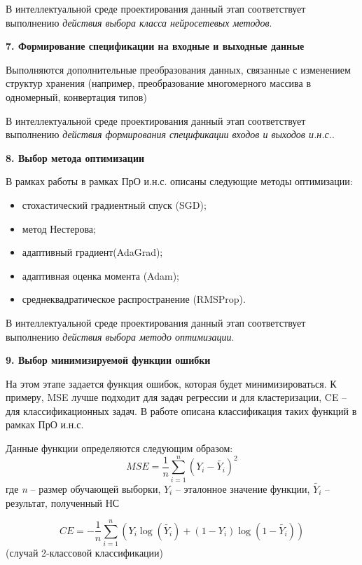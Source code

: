 В интеллектуальной среде проектирования данный этап соответствует выполнению \textit{действия выбора класса нейросетевых методов}.

\textbf{7. Формирование спецификации на входные и выходные данные}

Выполняются дополнительные преобразования данных, связанные с изменением структур хранения (например, преобразование многомерного массива в одномерный, конвертация типов)

В интеллектуальной среде проектирования данный этап соответствует выполнению \textit{действия формирования спецификации входов и выходов и.н.с.}.

\textbf{8. Выбор метода оптимизации }

В рамках работы \cite{Kovalev2022} в рамках ПрО и.н.с. описаны следующие методы оптимизации:
\begin{itemize}
	\item стохастический градиентный спуск (SGD);
	\item метод Нестерова;
	\item адаптивный градиент(AdaGrad);
	\item адаптивная оценка момента (Adam);
	\item среднеквадратическое распространение (RMSProp).
\end{itemize}

В интеллектуальной среде проектирования данный этап соответствует выполнению \textit{действия выбора методо оптимизации}.

\textbf{9. Выбор минимизируемой функции ошибки}

На этом этапе задается функция ошибок, которая будет минимизироваться. К примеру, MSE лучше подходит для задач регрессии и для кластеризации, CE -- для классификационных задач.
В работе \cite{Kovalev2022} описана классификация таких функций в рамках ПрО и.н.с.

Данные функции определяются следующим образом:
\begin{equation*}
	MSE = \frac{1}{n} \sum_{i=1}^n (Y_i - \widetilde{Y_i})^2    
\end{equation*}
где \textit{n} -- размер обучающей выборки, $Y_i$ -- эталонное значение функции, $\widetilde{Y_i}$ -- результат, полученный НС

\begin{equation*}
	CE = - \frac{1}{n} \sum_{i=1}^n (Y_i\log(\widetilde{Y_i}) + (1-Y_i)\log(1 - \widetilde{Y_i}))    
\end{equation*}
(случай 2-классовой классификации)

